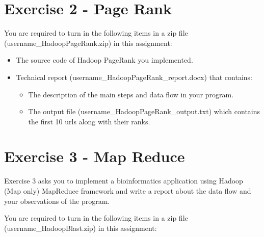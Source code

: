 


\chapter{Exercise 2 - Page Rank}\label{project-2}

You are required to turn in the following items in a zip file
(username\_HadoopPageRank.zip) in this assignment:

\begin{itemize}
\item
  The source code of Hadoop PageRank you implemented.
\item Technical report (username\_HadoopPageRank\_report.docx) that
  contains:
  \begin{itemize}
  \tightlist
  \item
    The description of the main steps and data flow in your program.
  \item
    The output file (username\_HadoopPageRank\_output.txt) which
    contains the first 10 urls along with their ranks.
  \end{itemize}
\end{itemize}



\chapter{Exercise 3 - Map Reduce}\label{project-3}

Exercise 3 asks you to implement a bioinformatics application using
Hadoop (Map only) MapReduce framework and write a report about the data
flow and your observations of the program.

You are required to turn in the following items in a zip file
(username\_HadoopBlast.zip) in this assignment:

